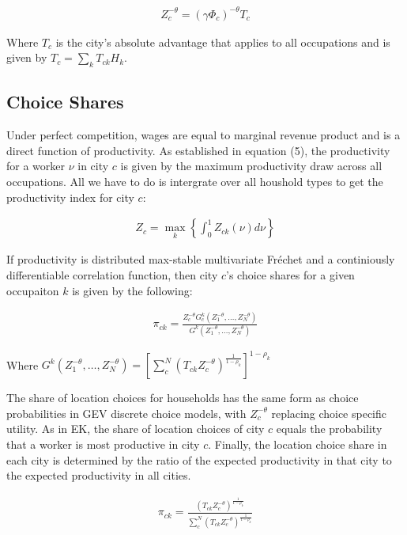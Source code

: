 \documentclass[10pt]{article}
\begin{document}
\begin{align}
    Z_c^{-\theta} = (\gamma \Phi_c)^{-\theta} T_c
\end{align}

Where $T_c$ is the city's absolute advantage that applies to all occupations and is given by $T_c = \sum_{k}^{} T_{ck} H_k$.

\subsection{Choice Shares}

Under perfect competition, wages are equal to marginal revenue product and is a direct function of productivity. As established in equation (5), the productivity for a worker $\nu$ in city $c$ is given by the maximum productivity draw across all occupations. All we have to do is intergrate over all houshold types to get the productivity index for city $c$:

\begin{align}
    Z_c = \max_k \left\{ \int_{0}^{1} Z_{ck} (\nu) d\nu \right\}
\end{align}

If productivity is distributed max-stable multivariate Fréchet and a continiously differentiable correlation function, then city $c$'s choice shares for a given occupaiton $k$ is given by the following:

\begin{align}
    \pi_{ck} = \frac{Z_c^{-\theta} G_c^k(Z_1^{-\theta}, \dots, Z_N^{-\theta})}{G^k(Z_1^{-\theta}, \dots, Z_N^{-\theta})}
\end{align}

Where $G^k (Z_1^{-\theta}, \dots, Z_N^{-\theta}) = [\sum_{c}^{N} (T_{ck} Z_c^{-\theta})^{\frac{1}{1 - \rho_k}}]^{1 - \rho_k}$

The share of location choices for households has the same form as choice probabilities in GEV discrete choice models, with $Z_c^{-\theta}$ replacing choice specific utility. As in EK, the share of location choices of city $c$ equals the probability that a worker is most productive in city $c$. Finally, the location choice share in each city is determined by the ratio of the expected productivity in that city to the expected productivity in all cities.

\begin{align}
    \pi_{ck} = \frac{(T_{ck} Z_c^{-\theta})^{\frac{1}{1 - \rho_k}}}{\sum_{c}^{N} (T_{ck} Z_c^{-\theta})^{\frac{1}{1 - \rho_k}}}
\end{align}
\end{document}
